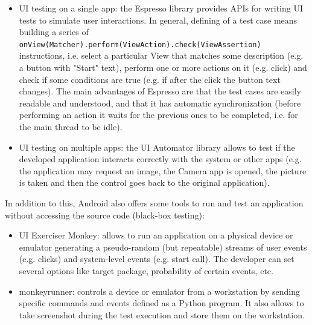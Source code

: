 \documentclass[11pt,a4paper,notitlepage]{article}
\begin{document}
\begin{itemize}
	\item UI testing on a single app: the Espresso library provides APIs for writing UI tests to simulate user interactions. In general, defining of a test case means building a series of \texttt{onView(Matcher).perform(ViewAction).check(ViewAssertion)} instructions, i.e. select a particular View that matches some description (e.g. a button with "Start" text), perform one or more actions on it (e.g. click) and check if some conditions are true (e.g. if after the click the button text changes). The main advantages of Espresso are that the test cases are easily readable and understood, and that it has automatic synchronization (before performing an action it waits for the previous ones to be completed, i.e. for the main thread to be idle).
	\item UI testing on multiple apps: the UI Automator library allows to test if the developed application interacts correctly with the system or other apps (e.g. the application may request an image, the Camera app is opened, the picture is taken and then the control goes back to the original application). 
\end{itemize}\bigskip
In addition to this, Android also offers some tools to run and test an application without accessing the source code (black-box testing):
\begin{itemize}
	\item UI Exerciser Monkey: allows to run an application on a physical device or emulator generating a pseudo-random (but repeatable) streams of user events (e.g. clicks) and system-level events (e.g. start call). The developer can set several options like target package, probability of certain events, etc.
	\item monkeyrunner: controls a device or emulator from a workstation by sending specific commands and events defined as a Python program. It also allows to take screenshot during the test execution and store them on the workstation.
\end{itemize}
\end{document}
